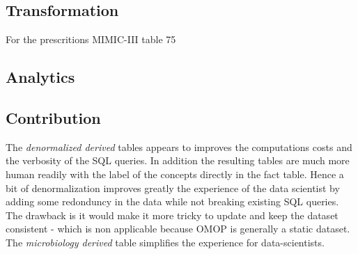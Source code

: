 \subsection{Transformation}
  For the prescritions MIMIC-III table 75%

\subsection{Analytics}

\subsection{Contribution}

The \emph{denormalized derived} tables appears to improves the computations
costs and the verbosity of the SQL queries. In addition the resulting tables
are much more human readily with the label of the concepts directly in the fact
table. Hence a bit of denormalization improves greatly the experience of the
data scientist by adding some redonduncy in the data while not breaking
existing SQL queries. The drawback is it would make it more tricky to update
and keep the dataset consistent - which is non applicable because OMOP is
generally a static dataset.
The \emph{microbiology derived} table simplifies the experience for data-scientists.


